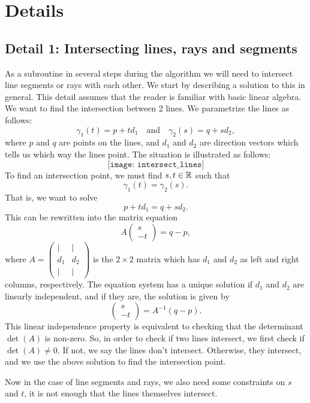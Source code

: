 \section{Details}

\subsection*{Detail 1: Intersecting lines, rays and segments}
As a subroutine in several steps during the algorithm we will need to intersect line segments or rays with each other. We start by describing a solution to this in general. This detail assumes that the reader is familiar with basic linear algebra. We want to find the intersection between 2 lines. We parametrize the lines as follows:
\[
    \gamma_1(t) = p + t d_1 \quad \text{and} \quad
    \gamma_2(s) = q + s d_2,
\]
where $p$ and $q$ are points on the lines, and $d_1$ and $d_2$ are direction vectors which tells us which way the lines point. The situation is illustrated as follows:
\[
    \texttt{[image: intersect\_lines]}
\]
To find an intersection point, we must find $s, t \in \mathbb{R}$ such that
\[
    \gamma_1(t) = \gamma_2(s).
\]
That is, we want to solve
\[
    p + t d_1 = q + s d_2.
\]
This can be rewritten into the matrix equation
\[
    A \begin{pmatrix}
        s \\
        -t
    \end{pmatrix}
    =
    q - p,
\]
where $A = \begin{pmatrix} \mid & \mid \\ d_1 & d_2 \\ \mid & \mid \end{pmatrix}$ is the $2 \times 2$ matrix which has $d_1$ and $d_2$ as left and right columns, respectively. The equation system has a unique solution if $d_1$ and $d_2$ are linearly independent, and if they are, the solution is given by
\[
    \begin{pmatrix}
        s \\
        -t
    \end{pmatrix}
    =
    A^{-1} (q - p).
\]
This linear independence property is equivalent to checking that the determinant $\det(A)$ is non-zero. So, in order to check if two lines intersect, we first check if $\det(A) \ne 0$. If not, we say the lines don't intersect. Otherwise, they intersect, and we use the above solution to find the intersection point.

Now in the case of line segments and rays, we also need some constraints on $s$ and $t$, it is not enough that the lines themselves intersect.

